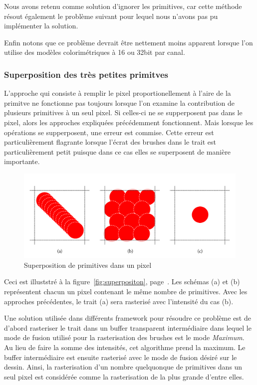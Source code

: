 			Nous avons retenu comme solution d'ignorer les primitives, car cette méthode résout également le problème suivant
			pour lequel nous n'avons pas pu implémenter la solution.
			
			Enfin notons que ce problème devrait être nettement moins apparent lorsque l'on utilise des modèles 
			colorimétriques à 16 ou 32bit par canal.

		\subsubsection{Superposition des très petites primitves}
			L'approche qui consiste à remplir le pixel proportionellement à l'aire de la primitve ne fonctionne
			pas toujours lorsque l'on examine la contribution de plusieurs primitives à un seul pixel. 
			Si celles-ci ne se supperposent pas dans le pixel, alors les approches expliquées précédemment fonctionnent.
			Mais lorsque les opérations se supperposent, une erreur est commise.  Cette erreur est particulièrement
			flagrante lorsque l'écrat des brushes dans le trait est particulièrement petit puisque dans ce cas elles
			se superposent de manière importante.

				\begin{figure}[ht]
					\centering
					\includegraphics[width=\textwidth]{images/superposition-primitives} 
					\caption{Superposition de primitives dans un pixel}
					\label{fig:superposition}
				\end{figure}
			
			Ceci est illuststré à la figure~\ref{fig:superpositon}, page~\pageref{fig:superposition}. Les schémas (a) et (b)
			représentent chacun un pixel contenant le même nombre de primitives. Avec les approches précédentes, le trait (a)
			sera rasterisé avec l'intensité du cas (b).

			Une solution utilisée dans différents framework pour résoudre ce problème est de d'abord rasteriser le trait
			dans un buffer transparent intermédiaire dans lequel le mode de fusion utilisé pour la rasterisation des 
			brushes est le mode \emph{Maximum}. Au lieu de faire la somme des intensités, cet algorithme prend la maximum.  
			Le buffer intermédiaire est ensuite rasterisé avec le mode
			de fusion désiré sur le dessin.  Ainsi, la rasterisation d'un nombre quelquonque de primitives dans un seul pixel
			est considérée comme la rasterisation de la plus grande d'entre elles. 
			
